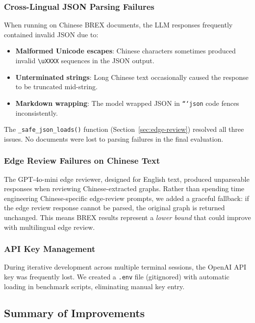 \documentclass[12pt,a4paper]{article}
\begin{document}
\subsubsection{Cross-Lingual JSON Parsing Failures}
When running on Chinese BREX documents, the LLM responses frequently contained invalid JSON due to:
\begin{itemize}[leftmargin=2em]
    \item \textbf{Malformed Unicode escapes}: Chinese characters sometimes produced invalid \texttt{\textbackslash uXXXX} sequences in the JSON output.
    \item \textbf{Unterminated strings}: Long Chinese text occasionally caused the response to be truncated mid-string.
    \item \textbf{Markdown wrapping}: The model wrapped JSON in \texttt{```json} code fences inconsistently.
\end{itemize}
The \texttt{\_safe\_json\_loads()} function (Section~\ref{sec:edge-review}) resolved all three issues. No documents were lost to parsing failures in the final evaluation.

\subsubsection{Edge Review Failures on Chinese Text}
The GPT-4o-mini edge reviewer, designed for English text, produced unparseable responses when reviewing Chinese-extracted graphs. Rather than spending time engineering Chinese-specific edge-review prompts, we added a graceful fallback: if the edge review response cannot be parsed, the original graph is returned unchanged. This means BREX results represent a \emph{lower bound} that could improve with multilingual edge review.

\subsubsection{API Key Management}
During iterative development across multiple terminal sessions, the OpenAI API key was frequently lost. We created a \texttt{.env} file (gitignored) with automatic loading in benchmark scripts, eliminating manual key entry.

\subsection{Summary of Improvements}
\label{sec:improvements-summary}
\end{document}
